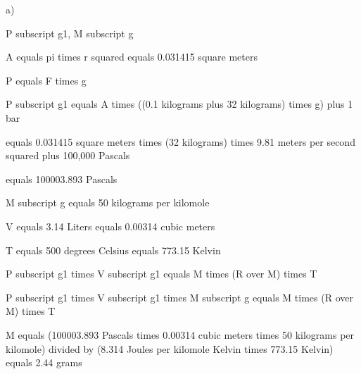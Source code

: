 a)

P subscript g1, M subscript g

A equals pi times r squared equals 0.031415 square meters

P equals F times g

P subscript g1 equals A times ((0.1 kilograms plus 32 kilograms) times g) plus 1 bar

equals 0.031415 square meters times (32 kilograms) times 9.81 meters per second squared plus 100,000 Pascals

equals 100003.893 Pascals

M subscript g equals 50 kilograms per kilomole

V equals 3.14 Liters equals 0.00314 cubic meters

T equals 500 degrees Celsius equals 773.15 Kelvin

P subscript g1 times V subscript g1 equals M times (R over M) times T

P subscript g1 times V subscript g1 times M subscript g equals M times (R over M) times T

M equals (100003.893 Pascals times 0.00314 cubic meters times 50 kilograms per kilomole) divided by (8.314 Joules per kilomole Kelvin times 773.15 Kelvin) equals 2.44 grams